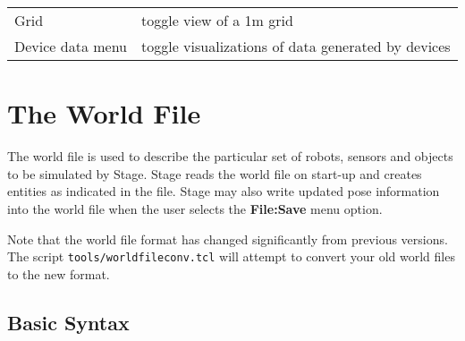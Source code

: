 \documentclass[11pt,twoside]{report}
\begin{document}
\begin{tabular}{|l|l|}
\hline 
Grid & toggle view of a 1m grid\\
Device data menu & toggle visualizations of data generated by devices\\
\hline
\end{tabular}


\chapter{The World File}
\label{sec:world}

The world file is used to describe the particular set of robots,
sensors and objects to be simulated by Stage.  Stage reads the world
file on start-up and creates entities as indicated in the file.  Stage
may also write updated pose information into the world file when the
user selects the {\bf File:Save} menu option.

Note that the world file format has changed significantly from
previous versions. The script \verb+tools/worldfileconv.tcl+ will
attempt to convert your old world files to the new format.

\section{Basic Syntax}
\end{document}
